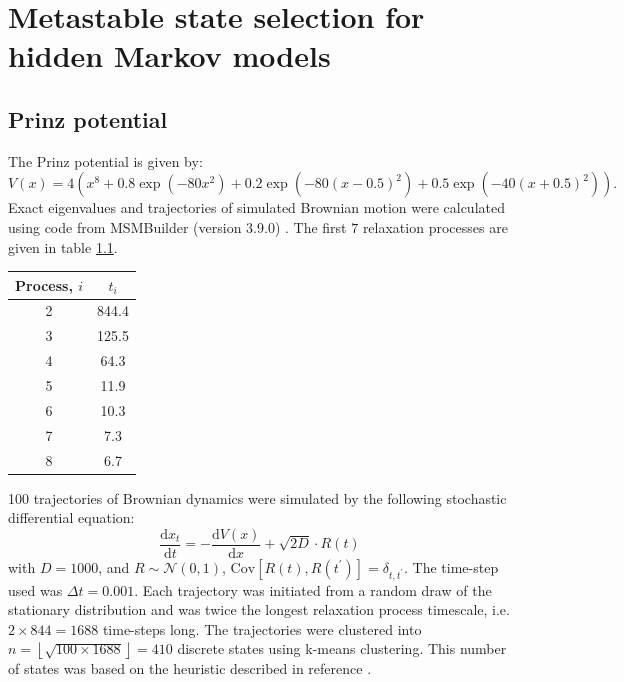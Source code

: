 \chapter{Metastable state selection for hidden Markov models}\label{app:hmm}
\section{Prinz potential}
 The Prinz potential is given by: 
\begin{equation}\label{eqn:prinz_pot}
 V(x) = 4\left(x^8 + 0.8 \exp{\left(-80 x^2\right)} + 0.2 \exp{\left(-80 (x-0.5)^2\right)} + 0.5\exp{\left(-40 (x+0.5)^2\right)}\right).
\end{equation}
Exact eigenvalues and trajectories of simulated Brownian motion were calculated using code from MSMBuilder (version 3.9.0)\cite{beauchampMSMBuilder2ModelingConformational2011} . The first $7$ relaxation processes are given in table \ref{tab:prinz_its_exact}. 
\begin{table}
 \centering
 \begin{tabular}{|c|c|}
 \hline
 Process, $i$ & $t_i$ \\
 \hline\hline
  2 & 844.4 \\
  3 & 125.5 \\
  4 & 64.3 \\
  5 & 11.9 \\
  6 & 10.3 \\
  7 & 7.3 \\
  8 & 6.7 \\
  \hline
 \end{tabular}
 \label{tab:prinz_its_exact}
\end{table}

\num{100} trajectories of Brownian dynamics were simulated by the following stochastic differential equation: 
\begin{equation}\label{eqn:prinz_dynamics}
 \frac{\mathrm{d}x_t}{\mathrm{d}t} = -\frac{\mathrm{d}V(x)}{\mathrm{d}x} + \sqrt{2D}\cdot R(t)
\end{equation}
with $D = 1000$, and $R\sim \mathcal{N}(0, 1)$, $\mathrm{Cov}\left[R(t), R(t^{\prime})\right]=\delta_{t, t^{\prime}}$. The time-step used was $\Delta t = 0.001$. Each trajectory was initiated from a random draw of the stationary distribution and was twice the longest relaxation process timescale, i.e. $2\times 844=1688$ time-steps long. The trajectories were clustered into $n = \left\lfloor\sqrt{100\times 1688}\right\rfloor =410$ discrete states using k-means clustering\cite{friedman2001elements}. This number of states was based on the heuristic described in reference \cite{husicWardClusteringImproves2017a}.

